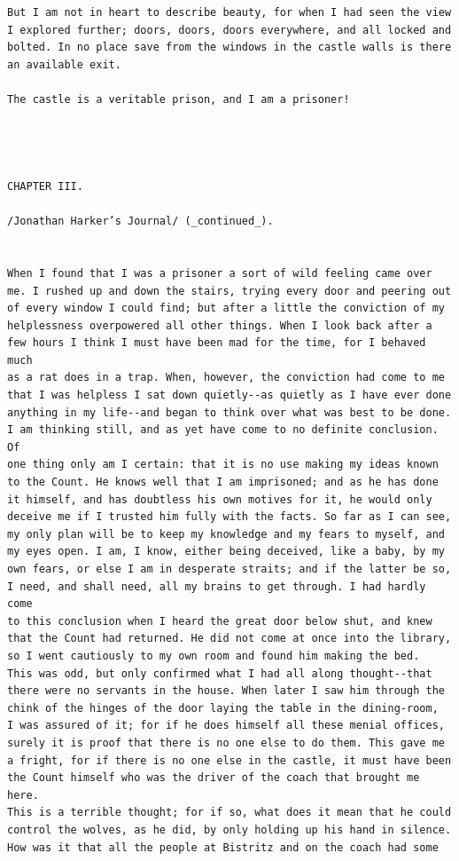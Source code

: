 \documentclass{article}
\begin{document}
\begin{verbatim}
But I am not in heart to describe beauty, for when I had seen the view
I explored further; doors, doors, doors everywhere, and all locked and
bolted. In no place save from the windows in the castle walls is there
an available exit.

The castle is a veritable prison, and I am a prisoner!




CHAPTER III.

/Jonathan Harker’s Journal/ (_continued_).


When I found that I was a prisoner a sort of wild feeling came over
me. I rushed up and down the stairs, trying every door and peering out
of every window I could find; but after a little the conviction of my
helplessness overpowered all other things. When I look back after a
few hours I think I must have been mad for the time, for I behaved much
as a rat does in a trap. When, however, the conviction had come to me
that I was helpless I sat down quietly--as quietly as I have ever done
anything in my life--and began to think over what was best to be done.
I am thinking still, and as yet have come to no definite conclusion. Of
one thing only am I certain: that it is no use making my ideas known
to the Count. He knows well that I am imprisoned; and as he has done
it himself, and has doubtless his own motives for it, he would only
deceive me if I trusted him fully with the facts. So far as I can see,
my only plan will be to keep my knowledge and my fears to myself, and
my eyes open. I am, I know, either being deceived, like a baby, by my
own fears, or else I am in desperate straits; and if the latter be so,
I need, and shall need, all my brains to get through. I had hardly come
to this conclusion when I heard the great door below shut, and knew
that the Count had returned. He did not come at once into the library,
so I went cautiously to my own room and found him making the bed.
This was odd, but only confirmed what I had all along thought--that
there were no servants in the house. When later I saw him through the
chink of the hinges of the door laying the table in the dining-room,
I was assured of it; for if he does himself all these menial offices,
surely it is proof that there is no one else to do them. This gave me
a fright, for if there is no one else in the castle, it must have been
the Count himself who was the driver of the coach that brought me here.
This is a terrible thought; for if so, what does it mean that he could
control the wolves, as he did, by only holding up his hand in silence.
How was it that all the people at Bistritz and on the coach had some

\end{verbatim}
\end{document}
